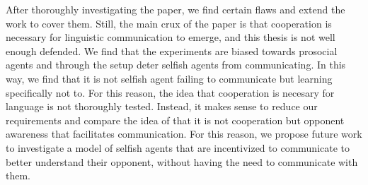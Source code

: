 \documentclass{article}
\begin{document}
After thoroughly investigating the paper, we find certain flaws and extend the
work to cover them. Still, the main crux of the paper is that cooperation is
necessary for linguistic communication to emerge, and this thesis is not well
enough defended. We find that the experiments are biased towards prosocial
agents and through the setup deter selfish agents from communicating. In this
way, we find that it is not selfish agent failing to communicate but learning
specifically not to. For this reason, the idea that cooperation is necesary for
language is not thoroughly tested. Instead, it makes sense to reduce our
requirements and compare the idea of \cite{wittgenstein2009philosophical} that
it is not cooperation but opponent awareness that facilitates communication. For
this reason, we propose future work to investigate a model of selfish agents
that are incentivized to communicate to better understand their opponent,
without having the need to communicate with them.



\end{document}
